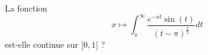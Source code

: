 

\begin{exercice}\label{exo_I-3-8}

La fonction
\begin{equation}
	x\mapsto\int_{\pi}^{\infty}\frac{  e^{-xt}\sin(t) }{ (t-\pi)^{\frac{ 1 }{2}} }dt
\end{equation}
est-elle continue sur $]0,1[$ ?

\end{exercice}
